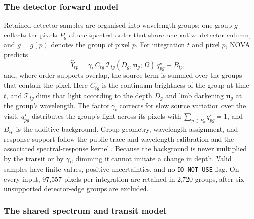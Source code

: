 \subsubsection{The detector forward model}


Retained detector samples are organised into wavelength groups: one
group $g$ collects the pixels $P_g$ of one spectral order that share one
native detector column, and $g=g(p)$ denotes the group of pixel $p$. For
integration $t$ and pixel $p$, NOVA predicts
\begin{equation}
 \widehat Y_{tp}
 = \gamma_t\, C_{tg}\,
   \mathcal{T}_{tg}(D_g, \bm{u}_g;\, \Omega)\,
   q^\star_{pg}
 + B_{tp},
 \label{eq:nova-forward}
\end{equation}
and, where order supports overlap, the source term is summed over the
groups that contain the pixel. Here $C_{tg}$ is the continuum brightness
of the group at time $t$, and $\mathcal{T}_{tg}$ dims that light
according to the depth $D_g$ and limb darkening $\bm{u}_g$ at the
group's wavelength. The factor $\gamma_t$ corrects for slow source
variation over the visit, $q^\star_{pg}$ distributes the group's light
across its pixels with $\sum_{p\in P_g} q^\star_{pg}=1$, and $B_{tp}$ is
the additive background. Group geometry, wavelength assignment, and
response support follow the public trace and wavelength calibration
\citep{BainesEtAl2023Trace,BainesEtAl2023Wavelength} and the associated
spectral-response kernel \citep{DarveauBernierEtAl2022,JWSTPipeline2025}.
Because the background is never multiplied by the transit or by
$\gamma_t$, dimming it cannot imitate a change in depth. Valid samples have finite values,
positive uncertainties, and no \texttt{DO\_NOT\_USE} flag. On every
input, 97{,}557 pixels per integration are retained in 2{,}720 groups,
after six unsupported detector-edge groups are excluded.

\subsubsection{The shared spectrum and transit model}


